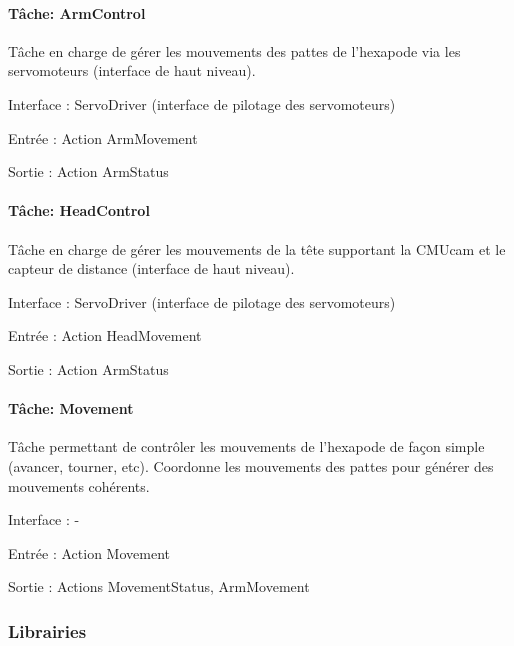 \paragraph*{Tâche\-: Arm\-Control}

Tâche en charge de gérer les mouvements des pattes de l'hexapode via les servomoteurs (interface de haut niveau).


\begin{DoxyItemize}
\item Interface \-: Servo\-Driver (interface de pilotage des servomoteurs)
\item Entrée \-: Action Arm\-Movement
\item Sortie \-: Action Arm\-Status
\end{DoxyItemize}

\paragraph*{Tâche\-: Head\-Control}

Tâche en charge de gérer les mouvements de la tête supportant la C\-M\-Ucam et le capteur de distance (interface de haut niveau).


\begin{DoxyItemize}
\item Interface \-: Servo\-Driver (interface de pilotage des servomoteurs)
\item Entrée \-: Action Head\-Movement
\item Sortie \-: Action Arm\-Status
\end{DoxyItemize}

\paragraph*{Tâche\-: Movement}

Tâche permettant de contrôler les mouvements de l'hexapode de façon simple (avancer, tourner, etc). Coordonne les mouvements des pattes pour générer des mouvements cohérents.


\begin{DoxyItemize}
\item Interface \-: -\/
\item Entrée \-: Action Movement
\item Sortie \-: Actions Movement\-Status, Arm\-Movement
\end{DoxyItemize}

\subsubsection*{Librairies}

